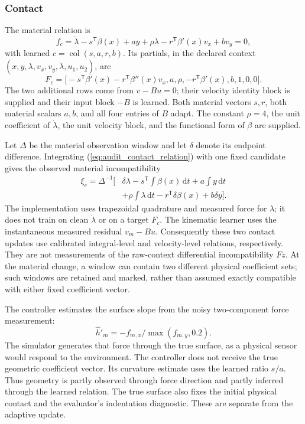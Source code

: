 \documentclass[journal]{IEEEtran}
\newcommand{\col}{\operatorname{col}}
\newcommand{\dd}{\,\mathrm d}
\begin{document}
\subsubsection{Contact}
The material relation is
\begin{equation}
 f_c=\dot\lambda-s^{\mathsf T}\beta(x)+ay+\rho\lambda
       -r^{\mathsf T}\beta'(x)v_x+bv_y=0,
 \label{eq:audit_contact_relation}
\end{equation}
with learned $c=\col(s,a,r,b)$. Its partials, in the declared context
$(x,y,\lambda,v_x,v_y,\dot\lambda,u_1,u_2)$, are
\begin{equation}
 F_c=\bigl[-s^{\mathsf T}\beta'(x)-r^{\mathsf T}\beta''(x)v_x,
 a,\rho,-r^{\mathsf T}\beta'(x),b,1,0,0\bigr].
 \label{eq:audit_contact_partials}
\end{equation}
The two additional rows come from $v-Bu=0$; their velocity identity block
is supplied and their input block $-B$ is learned. Both material vectors
$s,r$, both material scalars $a,b$, and all four entries of $B$ adapt.
The constant $\rho=4$, the unit coefficient of $\dot\lambda$, the unit
velocity block, and the functional form of $\beta$ are supplied.

Let $\Delta$ be the material observation window and let $\delta$ denote
its endpoint difference. Integrating (\ref{eq:audit_contact_relation})
with one fixed candidate gives the observed material incompatibility
\begin{equation}
 \begin{split}
 \xi_c=\Delta^{-1}\biggl[&\delta\lambda-s^{\mathsf T}\!\int\beta(x)\dd t
 +a\!\int y\dd t\\
 &+\rho\!\int\lambda\dd t-r^{\mathsf T}\delta\beta(x)+b\delta y\biggr].
 \end{split}
 \label{eq:audit_contact_integral}
\end{equation}
The implementation uses trapezoidal quadrature and measured force for
$\lambda$; it does not train on clean $\dot\lambda$ or on a target $F_c$.
The kinematic learner uses the instantaneous measured residual $v_m-Bu$.
Consequently these two contact updates use calibrated integral-level and
velocity-level relations, respectively. They are not measurements of the
raw-context differential incompatibility $F\dot z$. At the material
change, a window can contain two different physical coefficient sets;
such windows are retained and marked, rather than assumed exactly
compatible with either fixed coefficient vector.

The controller estimates the surface slope from the noisy two-component
force measurement:
\begin{equation*}
 \widehat h'_m=-f_{m,x}/\max(f_{m,y},0.2).
\end{equation*}
The simulator generates
that force through the true surface, as a physical sensor would respond to
the environment. The controller does not receive the true geometric
coefficient vector. Its curvature estimate uses the learned ratio $s/a$.
Thus geometry is partly observed through force direction and partly
inferred through the learned relation. The true surface also fixes the
initial physical contact and the evaluator's indentation diagnostic.
These are separate from the adaptive update.
\end{document}
